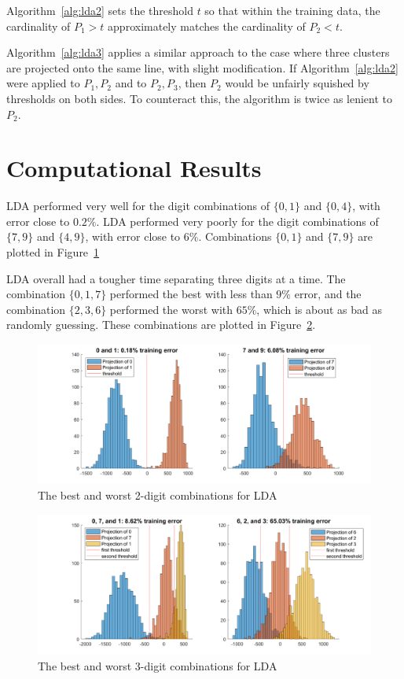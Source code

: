 \documentclass{article}
\begin{document}
Algorithm~\ref{alg:lda2} sets the threshold $t$ so that within the training data, the cardinality of $P_1 > t$ approximately matches the cardinality of $P_2 < t$.

Algorithm~\ref{alg:lda3} applies a similar approach to the case where three clusters are projected onto the same line, with slight modification. If Algorithm~\ref{alg:lda2} were applied to $P_1,P_2$ and to $P_2,P_3$, then $P_2$ would be unfairly squished by thresholds on both sides. To counteract this, the algorithm is twice as lenient to $P_2$.



\section{Computational Results}



LDA performed very well for the digit combinations of $\{0,1\}$ and $\{0,4\}$, with error close to $0.2\%$. LDA performed very poorly for the digit combinations of $\{7,9\}$ and $\{4,9\}$, with error close to $6\%$. Combinations $\{0,1\}$ and $\{7,9\}$ are plotted in Figure~\ref{fig:bestworst}

LDA overall had a tougher time separating three digits at a time. The combination $\{0,1,7\}$ performed the best with less than $9\%$ error, and the combination $\{2,3,6\}$ performed the worst with $65\%$, which is about as bad as randomly guessing. These combinations are plotted in Figure~\ref{fig:triple}.


\begin{figure}[!h]
	\centering
	\includegraphics[scale=0.6]{bestworst}
	\caption{The best and worst 2-digit combinations for LDA}
	\label{fig:bestworst}
\end{figure}

\begin{figure}[!h]
	\centering
	\includegraphics[scale=0.6]{bestworst3}
	\caption{The best and worst 3-digit combinations for LDA}
	\label{fig:triple}
\end{figure}
\end{document}
